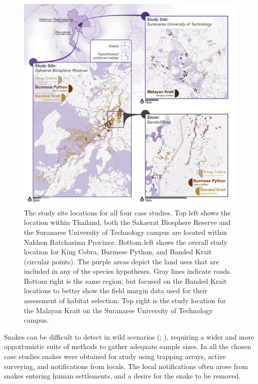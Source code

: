 \documentclass[10pt,a4paper]{article}
\begin{document}
\begin{figure}
\includegraphics[width=1\linewidth]{../ext_images/LocationMap} \caption{The study site locations for all four case studies. Top left shows the location within Thailand, both the Sakaerat Biosphere Reserve and the Suranaree University of Technology campus are located within Nakhon Ratchasima Province. Bottom left shows the overall study location for King Cobra, Burmese Python, and Banded Krait (circular points). The purple areas depict the land uses that are included in any of the species hypotheses. Gray lines indicate roads. Bottom right is the same region, but focused on the Banded Krait locations to better show the field margin data used for their assessment of habitat selection. Top right is the study location for the Malayan Krait on the Suranaree University of Technology campus.}\label{fig:locationFigure}
\end{figure}

Snakes can be difficult to detect in wild scenarios (; ), requiring a wider and more opportunistic suite of methods to gather adequate sample sizes.
In all the chosen case studies snakes were obtained for study using trapping arrays, active surveying, and notifications from locals.
The local notifications often arose from snakes entering human settlements, and a desire for the snake to be removed.
\end{document}
